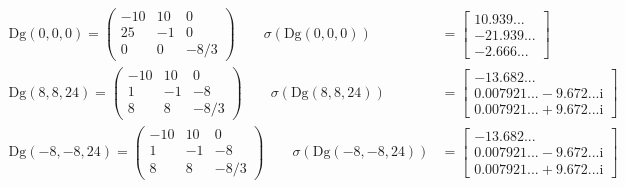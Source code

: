 \documentclass[a4paper]{article}
\newcommand{\vf}[1]{\boldsymbol{\mathrm{#1}}} %
\newcommand{\ii}{\mathrm{i}} %
\theoremstyle{definition}
\begin{document}
\begin{align*}
  \vf{Dg}(0,0,0)=\begin{pmatrix}
                   -10 & 10 & 0    \\
                   25  & -1 & 0    \\
                   0   & 0  & -8/3
                 \end{pmatrix}  \qquad\sigma(\vf{Dg}(0,0,0))   & = \begin{bmatrix}
                                                                     10.939... \\ -21.939...\\-2.666...
                                                                   \end{bmatrix}                                 \\
  \vf{Dg}(8,8,24)=\begin{pmatrix}
                    -10 & 10 & 0    \\
                    1   & -1 & -8   \\
                    8   & 8  & -8/3
                  \end{pmatrix} \qquad \sigma(\vf{Dg}(8,8,24))  & = \begin{bmatrix}
                                                                      -13.682... \\ 0.007921...-9.672...\ii\\ 0.007921...+9.672...\ii
                                                                    \end{bmatrix}   \\
  \vf{Dg}(-8,-8,24)=\begin{pmatrix}
                      -10 & 10 & 0    \\
                      1   & -1 & -8   \\
                      8   & 8  & -8/3
                    \end{pmatrix} \qquad\sigma(\vf{Dg}(-8,-8,24)) & = \begin{bmatrix}
                                                                        -13.682... \\ 0.007921...-9.672...\ii\\ 0.007921...+9.672...\ii
                                                                      \end{bmatrix}
\end{align*}
\end{document}
